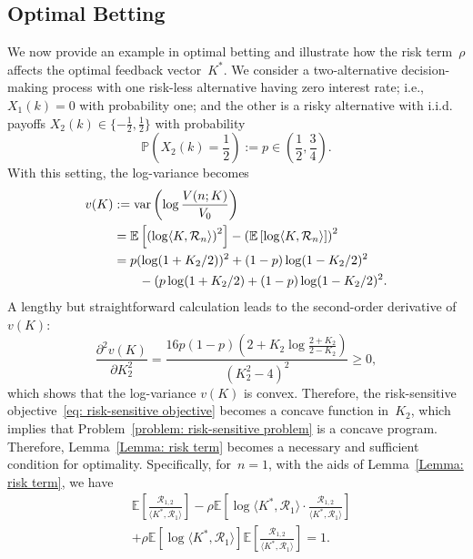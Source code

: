 \subsection{Optimal Betting}
    We now provide an example in optimal betting and illustrate how the risk term~$\rho$ affects the optimal feedback vector~$K^*$. We consider a two-alternative decision-making process with one risk-less alternative having zero interest rate; i.e., $X_1(k)=0$ with probability one; and the other is a risky alternative with i.i.d. payoffs $X_2(k) \in \{ -\frac{1}{2},\frac{1}{2} \}$ with probability
    $$
    \mathbb{P}\left( X_2(k) = \frac{1}{2} \right) := p \in \left( \frac{1}{2}, \frac{3}{4} \right).
    $$
With this setting, the log-variance becomes
\begin{align*}
    v(K)
    & := {\rm var}\left( \log \frac{V(n; K)}{V_0} \right) \\
    & = \mathbb{E}\left[ \left( \log \langle K, \mathcal{R}_n \rangle  \right)^2 \right]  
        - \left( \mathbb{E} \left[ \log\langle K, \mathcal{R}_n \rangle  \right] \right)^2\\
    & = p (\log (1 + K_2/2))^2  + (1-p) \log (1- K_2/2 )^2  \\
    & \qquad - (p \log (1 + K_2/2) + (1-p)\log (1 - K_2/2)^2.
\end{align*}
A lengthy but straightforward calculation leads to the second-order derivative of $v(K)$:
\[
\frac{\partial^2 v(K)}{ \partial K_2^2 } = \frac{16 p (1-p)  (2 + K_2 \log \frac{2 + K_2 }{2 - K_2} )}{ \left( K_2^2 - 4 \right)^2} \geq 0,
\]
which shows that the log-variance $v(K)$ is convex. Therefore, the risk-sensitive objective~\eqref{eq: risk-sensitive objective} becomes a concave function in~$K_2$, which implies that Problem~\eqref{problem: risk-sensitive problem} is a concave program. Therefore, Lemma~\ref{Lemma: risk term} becomes a necessary and sufficient condition for optimality.    
Specifically, for~$n=1$, with the aids of Lemma~\ref{Lemma: risk term}, we have
\begin{align*}
        & \mathbb{E} \left[ \frac{ \mathcal{R}_{1,2} }{ \langle K^{*}, \mathcal{R}_1 \rangle } \right] - \rho\mathbb{E}\left[ \log \langle K^{*}, \mathcal{R}_1 \rangle \cdot \frac{ \mathcal{R}_{1,2} }{ \langle K^{*}, \mathcal{R}_1 \rangle } \right] \\
        & + \rho \mathbb{E} \left[ \log \langle K^{*}, \mathcal{R}_1 \rangle \right] \mathbb{E}\left[ \frac{\mathcal{R}_{1,2}}{ \langle K^{*}, \mathcal{R}_1 \rangle } \right] = 1.
    \end{align*}
